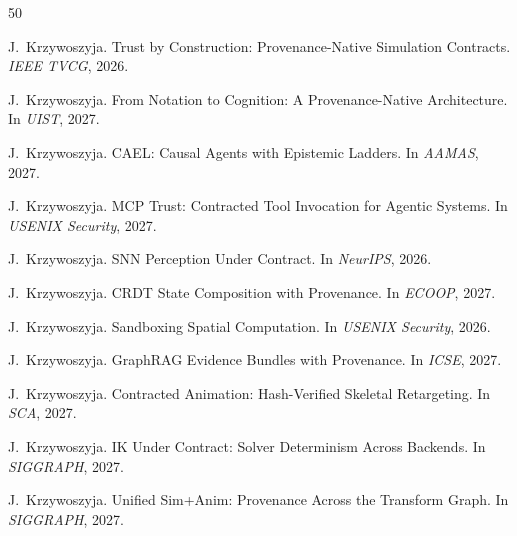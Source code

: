 \documentclass[sigconf,nonacm]{acmart}
\begin{document}
\iffalse
\begin{thebibliography}{50}

J.~Krzywoszyja.
\newblock Trust by Construction: Provenance-Native Simulation Contracts.
\newblock \emph{IEEE TVCG}, 2026.

J.~Krzywoszyja.
\newblock From Notation to Cognition: A Provenance-Native Architecture.
\newblock In \emph{UIST}, 2027.

J.~Krzywoszyja.
\newblock CAEL: Causal Agents with Epistemic Ladders.
\newblock In \emph{AAMAS}, 2027.

J.~Krzywoszyja.
\newblock MCP Trust: Contracted Tool Invocation for Agentic Systems.
\newblock In \emph{USENIX Security}, 2027.

J.~Krzywoszyja.
\newblock SNN Perception Under Contract.
\newblock In \emph{NeurIPS}, 2026.

J.~Krzywoszyja.
\newblock CRDT State Composition with Provenance.
\newblock In \emph{ECOOP}, 2027.

J.~Krzywoszyja.
\newblock Sandboxing Spatial Computation.
\newblock In \emph{USENIX Security}, 2026.

J.~Krzywoszyja.
\newblock GraphRAG Evidence Bundles with Provenance.
\newblock In \emph{ICSE}, 2027.

J.~Krzywoszyja.
\newblock Contracted Animation: Hash-Verified Skeletal Retargeting.
\newblock In \emph{SCA}, 2027.

J.~Krzywoszyja.
\newblock IK Under Contract: Solver Determinism Across Backends.
\newblock In \emph{SIGGRAPH}, 2027.

J.~Krzywoszyja.
\newblock Unified Sim+Anim: Provenance Across the Transform Graph.
\newblock In \emph{SIGGRAPH}, 2027.


\end{thebibliography}
\end{document}
